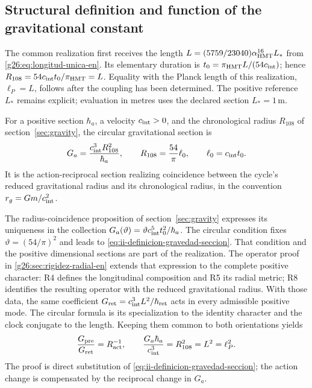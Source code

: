 \subsection{Structural definition and function of the gravitational constant}
\label{sec:ii-definicion-gravedad}

The common realization first receives the length
\(L=(5759/23040)\alpha_{\mathrm{HMT}}^{16}L_*\) from
\eqref{g26:eq:longitud-unica-en}. Its elementary duration is
\(t_0=\pi_{\mathrm{HMT}}L/(54c_{\rm int})\); hence
\(R_{108}=54c_{\rm int}t_0/\pi_{\mathrm{HMT}}=L\).
Equality with the Planck length of this realization,
\(\ell_P=L\), follows after the coupling has been determined.
The positive reference \(L_*\) remains explicit; evaluation in metres
uses the declared section \(L_*=1\,\mathrm m\).

\begin{definition}
For a positive section \(\hbar_a\), a velocity
\(c_{\rm int}>0\), and the chronological radius \(R_{108}\) of
section~\ref{sec:gravity}, the circular gravitational section is
\begin{equation}
 G_a=\frac{c_{\rm int}^{3}R_{108}^{2}}{\hbar_a},
 \qquad R_{108}=\frac{54}{\pi}\ell_0,
 \qquad \ell_0=c_{\rm int}t_0.
 \label{eq:ii-definicion-gravedad-seccion}
\end{equation}
It is the action-reciprocal section realizing coincidence
between the cycle's reduced gravitational radius and its
chronological radius, in the convention \(r_g=Gm/c_{\rm int}^2\).
\end{definition}

The radius-coincidence proposition of
section~\ref{sec:gravity} expresses its uniqueness in the collection
\(G_a(\vartheta)=\vartheta c_{\rm int}^{5}t_0^2/\hbar_a\).
The circular condition fixes \(\vartheta=(54/\pi)^2\) and leads
to \eqref{eq:ii-definicion-gravedad-seccion}. That condition and the
positive dimensional sections are part of the realization.
The operator proof in \ref{g26:sec:rigidez-radial-en} extends that
expression to the complete positive character: R4 defines the longitudinal
composition and R5 its radial metric; R8 identifies the resulting operator
with the reduced gravitational radius. With those data, the same coefficient
\(G_{\rm ret}=c_{\rm int}^3L^2/\hbar_{\rm ret}\) acts in every
admissible positive mode. The circular formula is its specialization
to the identity character and the clock conjugate to the length.
Keeping them common to both orientations yields
\begin{equation}
 \frac{G_{\mathrm{pre}}}{G_{\mathrm{ret}}}
 =R_{\mathrm{act}}^{-1},
 \qquad
 \frac{G_a\hbar_a}{c_{\rm int}^{3}}
 =R_{108}^{2}=L^2=\ell_P^2.
 \label{eq:ii-definicion-gravedad-area}
\end{equation}
The proof is direct substitution of
\eqref{eq:ii-definicion-gravedad-seccion}; the action change
is compensated by the reciprocal change in \(G_a\).

